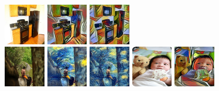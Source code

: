 \documentclass[runningheads]{llncs}
\begin{document}
\begin{figure}
  \includegraphics[width=0.16\textwidth]{21_orig.jpg}
  \includegraphics[width=0.16\textwidth]{21_muse_baseline.jpg}
  \includegraphics[width=0.16\textwidth]{21_muse_mine.jpg} \\
  \includegraphics[width=0.16\textwidth]{28_orig.jpg}
  \includegraphics[width=0.16\textwidth]{28_starry_baseline.jpg}
  \includegraphics[width=0.16\textwidth]{28_starry_mine.jpg}
  \includegraphics[width=0.16\textwidth]{31_orig.jpg}
  \includegraphics[width=0.16\textwidth]{31_muse_baseline.jpg}

\end{figure}
\end{document}
